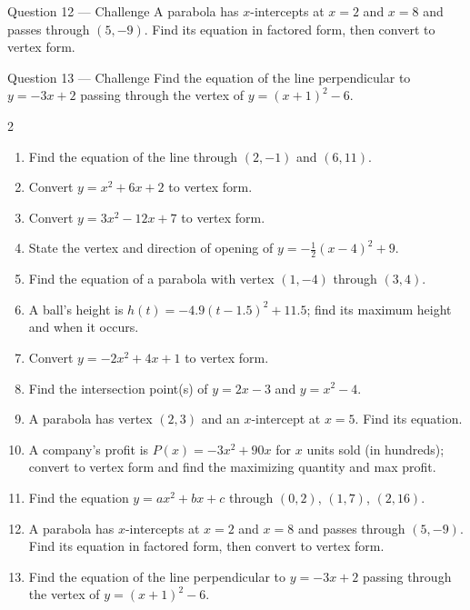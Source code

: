 \documentclass[11pt]{article}
\begin{document}
\begin{qbox}{Question 12 --- Challenge}
A parabola has $x$-intercepts at $x=2$ and $x=8$ and passes through $(5,-9)$. Find its equation in factored form, then convert to vertex form.\workspace{3.4cm}
\end{qbox}

\begin{qbox}{Question 13 --- Challenge}
Find the equation of the line perpendicular to $y=-3x+2$ passing through the vertex of $y=(x+1)^2-6$.\workspace{3.2cm}
\end{qbox}

\clearpage
{}

\begin{recapbox}
\begin{multicols}{2}
\small
\begin{enumerate}[leftmargin=*,itemsep=3pt]
  \item Find the equation of the line through $(2,-1)$ and $(6,11)$.
  \item Convert $y=x^2+6x+2$ to vertex form.
  \item Convert $y=3x^2-12x+7$ to vertex form.
  \item State the vertex and direction of opening of $y=-\tfrac12(x-4)^2+9$.
  \item Find the equation of a parabola with vertex $(1,-4)$ through $(3,4)$.
  \item A ball's height is $h(t)=-4.9(t-1.5)^2+11.5$; find its maximum height and when it occurs.
  \item Convert $y=-2x^2+4x+1$ to vertex form.
  \item Find the intersection point(s) of $y=2x-3$ and $y=x^2-4$.
  \item A parabola has vertex $(2,3)$ and an $x$-intercept at $x=5$. Find its equation.
  \item A company's profit is $P(x)=-3x^2+90x$ for $x$ units sold (in hundreds); convert to vertex form and find the maximizing quantity and max profit.
  \item Find the equation $y=ax^2+bx+c$ through $(0,2)$, $(1,7)$, $(2,16)$.
  \item A parabola has $x$-intercepts at $x=2$ and $x=8$ and passes through $(5,-9)$. Find its equation in factored form, then convert to vertex form.
  \item Find the equation of the line perpendicular to $y=-3x+2$ passing through the vertex of $y=(x+1)^2-6$.
\end{enumerate}
\end{multicols}
\end{recapbox}
\end{document}
